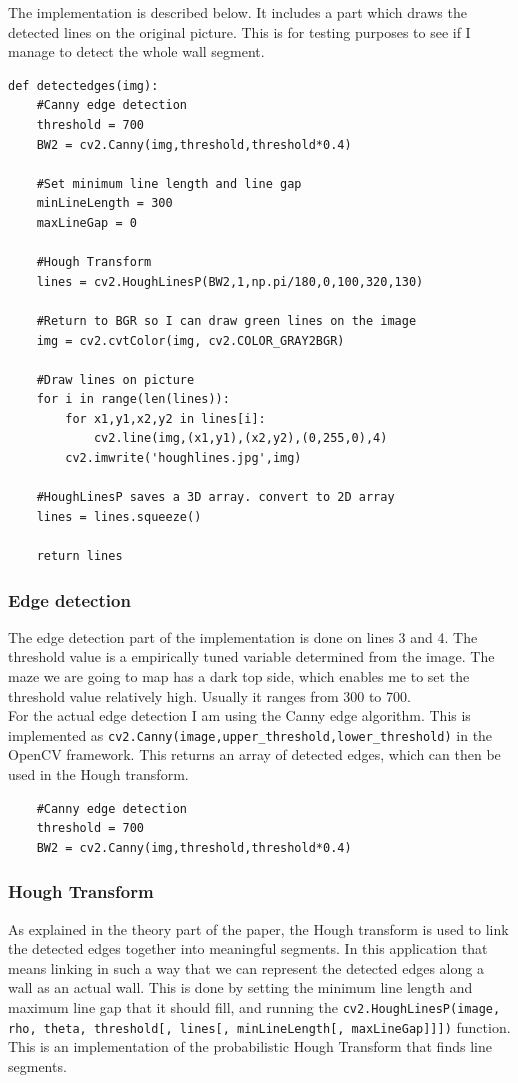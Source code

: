 The implementation is described below. It includes a part which draws the detected lines on the original picture. This is for testing purposes to see if I manage to detect the whole wall segment.
\begin{verbatim}
def detectedges(img):
    #Canny edge detection
    threshold = 700
    BW2 = cv2.Canny(img,threshold,threshold*0.4)
    
    #Set minimum line length and line gap
    minLineLength = 300
    maxLineGap = 0

    #Hough Transform
    lines = cv2.HoughLinesP(BW2,1,np.pi/180,0,100,320,130)

    #Return to BGR so I can draw green lines on the image
    img = cv2.cvtColor(img, cv2.COLOR_GRAY2BGR)
    
    #Draw lines on picture
    for i in range(len(lines)):
        for x1,y1,x2,y2 in lines[i]:
            cv2.line(img,(x1,y1),(x2,y2),(0,255,0),4)
        cv2.imwrite('houghlines.jpg',img)

    #HoughLinesP saves a 3D array. convert to 2D array
    lines = lines.squeeze()
    
    return lines
\end{verbatim}

\subsubsection{Edge detection}
The edge detection part of the implementation is done on lines 3 and 4. The threshold value is a empirically tuned variable determined from the image. The maze we are going to map has a dark top side, which enables me to set the threshold value relatively high. Usually it ranges from 300 to 700. \\

For the actual edge detection I am using the Canny edge algorithm. This is implemented as \texttt{cv2.Canny(image,upper\_threshold,lower\_threshold)} in the OpenCV framework. This returns an array of detected edges, which can then be used in the Hough transform.

\begin{verbatim}
    #Canny edge detection
    threshold = 700
    BW2 = cv2.Canny(img,threshold,threshold*0.4)
\end{verbatim}

\subsubsection{Hough Transform}
As explained in the theory part of the paper, the Hough transform is used to link the detected edges together into meaningful segments. In this application that means linking in such a way that we can represent the detected edges along a wall as an actual wall. This is done by setting the minimum line length and maximum line gap that it should fill, and running the \texttt{cv2.HoughLinesP(image, rho, theta, threshold[, lines[, minLineLength[, maxLineGap]]])} function. This is an implementation of the probabilistic Hough Transform that finds line segments.\\

